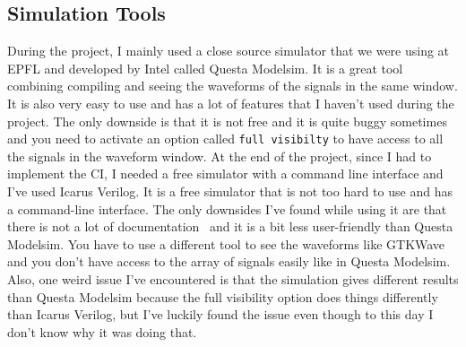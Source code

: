 \subsection{Simulation Tools}
During the project, I mainly used a close source simulator that we were using at EPFL and 
developed by Intel called Questa Modelsim. It is a great tool combining compiling and seeing 
the waveforms of the signals in the same window. It is also very easy to use and has a lot of
features that I haven't used during the project. The only downside is that it is not free and
it is quite buggy sometimes and you need to activate an option called \texttt{full visibilty}
to have access to all the signals in the waveform window. At the end of the project, since I had 
to implement the CI, I needed a free simulator with a command line interface and I've used
Icarus Verilog. It is a free simulator that is not too hard to use and has a command-line interface.
The only downsides I've found while using it are that there is not a lot of documentation~\cite{icarus_tutorial} 
and it is a bit less user-friendly than Questa Modelsim. You have to use a different tool to see the waveforms
like GTKWave and you don't have access to the array of signals easily like in Questa Modelsim.
Also, one weird issue I've encountered is that the simulation gives different results than Questa Modelsim
because the full visibility option does things differently than Icarus Verilog, but I've luckily
found the issue even though to this day I don't know why it was doing that.